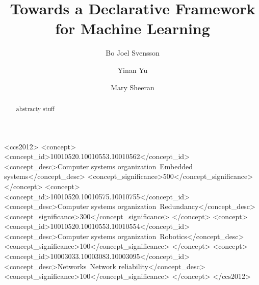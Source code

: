 \documentclass[sigplan,screen,authordraft]{acmart}
\begin{document}
\title{Towards a Declarative Framework for Machine Learning}


\author{Bo Joel Svensson}
\author{Yinan Yu}
\author{Mary Sheeran}

\renewcommand{\shortauthors}{Svensson, et al.}

\begin{abstract}

  abstracty stuff

\end{abstract}

\begin{CCSXML}
<ccs2012>
 <concept>
  <concept_id>10010520.10010553.10010562</concept_id>
  <concept_desc>Computer systems organization~Embedded systems</concept_desc>
  <concept_significance>500</concept_significance>
 </concept>
 <concept>
  <concept_id>10010520.10010575.10010755</concept_id>
  <concept_desc>Computer systems organization~Redundancy</concept_desc>
  <concept_significance>300</concept_significance>
 </concept>
 <concept>
  <concept_id>10010520.10010553.10010554</concept_id>
  <concept_desc>Computer systems organization~Robotics</concept_desc>
  <concept_significance>100</concept_significance>
 </concept>
 <concept>
  <concept_id>10003033.10003083.10003095</concept_id>
  <concept_desc>Networks~Network reliability</concept_desc>
  <concept_significance>100</concept_significance>
 </concept>
</ccs2012>
\end{CCSXML}



\end{document}
